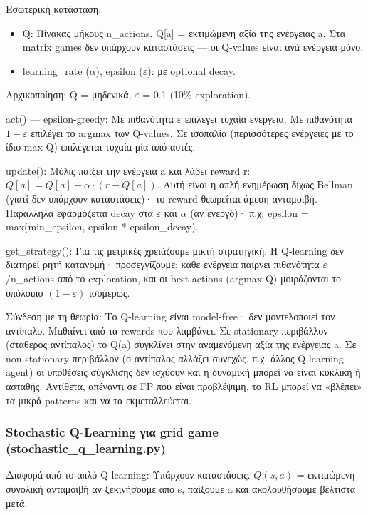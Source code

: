 \documentclass[11pt,a4paper]{article}
\newcommand{\eng}[1]{\foreignlanguage{english}{#1}}
\begin{document}
Εσωτερική κατάσταση:

\begin{itemize}
\item \eng{Q}: Πίνακας μήκους n\_actions. Q[a] = εκτιμώμενη αξία της ενέργειας a. Στα matrix games δεν υπάρχουν καταστάσεις — οι Q-values είναι ανά ενέργεια μόνο.
\item \eng{learning\_rate} (\(\alpha\)), \eng{epsilon} (\(\varepsilon\)): με optional decay.
\end{itemize}

Αρχικοποίηση: Q = μηδενικά, \(\varepsilon\) = 0.1 (10\% exploration).

\eng{act()} — epsilon-greedy: Με πιθανότητα \(\varepsilon\) επιλέγει τυχαία ενέργεια. Με πιθανότητα \(1-\varepsilon\) επιλέγει το argmax των Q-values. Σε ισοπαλία (περισσότερες ενέργειες με το ίδιο max Q) επιλέγεται τυχαία μία από αυτές.

\eng{update()}: Μόλις παίξει την ενέργεια a και λάβει reward r:
\(Q[a] = Q[a] + \alpha \cdot (r - Q[a])\).
Αυτή είναι η απλή ενημέρωση δίχως Bellman (γιατί δεν υπάρχουν καταστάσεις)· το reward θεωρείται άμεση ανταμοιβή. Παράλληλα εφαρμόζεται decay στα \(\varepsilon\) και \(\alpha\) (αν ενεργό)· π.χ. epsilon = max(min\_epsilon, epsilon * epsilon\_decay).

\eng{get\_strategy()}: Για τις μετρικές χρειάζουμε μικτή στρατηγική. Η Q-learning δεν διατηρεί ρητή κατανομή· προσεγγίζουμε: κάθε ενέργεια παίρνει πιθανότητα \(\varepsilon\)/n\_actions από το exploration, και οι best actions (argmax Q) μοιράζονται το υπόλοιπο \((1-\varepsilon)\) ισομερώς.

Σύνδεση με τη θεωρία: Το Q-learning είναι model-free· δεν μοντελοποιεί τον αντίπαλο. Μαθαίνει από τα rewards που λαμβάνει. Σε stationary περιβάλλον (σταθερός αντίπαλος) το Q(a) συγκλίνει στην αναμενόμενη αξία της ενέργειας a. Σε non-stationary περιβάλλον (ο αντίπαλος αλλάζει συνεχώς, π.χ. άλλος Q-learning agent) οι υποθέσεις σύγκλισης δεν ισχύουν και η δυναμική μπορεί να είναι κυκλική ή ασταθής. Αντίθετα, απέναντι σε FP που είναι προβλέψιμη, το RL μπορεί να «βλέπει» τα μικρά patterns και να τα εκμεταλλεύεται.

\subsubsection{Stochastic Q-Learning για grid game (\eng{stochastic\_q\_learning.py})}

Διαφορά από το απλό Q-learning: Υπάρχουν καταστάσεις. \(Q(s, a)\) = εκτιμώμενη συνολική ανταμοιβή αν ξεκινήσουμε από s, παίξουμε a και ακολουθήσουμε βέλτιστα μετά.
\end{document}
